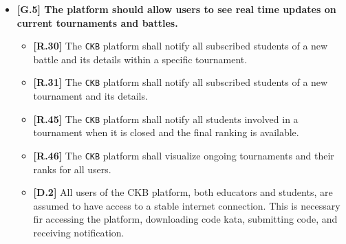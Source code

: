 \begin{itemize}
        \item \textbf{{[G.5]} The platform should allow users to see real time updates on current tournaments and battles.}
        \begin{itemize}
            \item \textbf{[R.30]} The \verb|CKB| platform shall notify all subscribed students of a new battle and its details within a specific tournament.
            \item \textbf{[R.31]} The \verb|CKB| platform shall notify all subscribed students of a new tournament and its details.
            \item \textbf{[R.45]} The \verb|CKB| platform shall notify all students involved in a tournament when it is closed and the final ranking is available. 
            \item \textbf{[R.46]} The \verb|CKB| platform shall visualize ongoing tournaments and their ranks for all users.
            \item \textbf{[D.2]} All users of the CKB platform, both educators and students, are assumed to have access to a stable internet connection. This is
            necessary fir accessing the platform, downloading code kata, submitting code, and receiving notification.
        \end{itemize}


\end{itemize}
